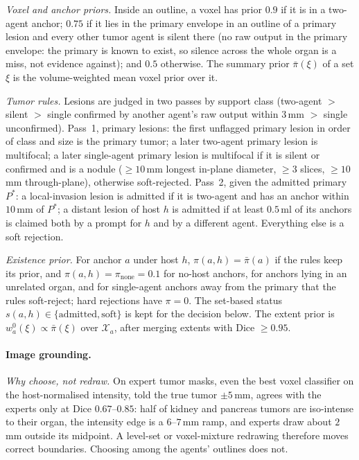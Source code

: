 \documentclass[fleqn,10pt]{olplainarticle}
\begin{document}
\emph{Voxel and anchor priors.} Inside an outline, a voxel has prior $0.9$ if it is in a two-agent anchor; $0.75$ if it
lies in the primary envelope in an outline of a primary lesion and every other tumor agent is silent there (no raw output in
the primary envelope: the primary is known to exist, so silence across the whole organ is a miss, not evidence against);
and $0.5$ otherwise. The summary prior $\bar\pi(\xi)$ of a set $\xi$ is the volume-weighted mean voxel prior over it.

\emph{Tumor rules.} Lesions are judged in two passes by support class (two-agent $>$ silent $>$ single confirmed by another
agent's raw output within $3$\,mm $>$ single unconfirmed). Pass~1, primary lesions: the first unflagged primary lesion in
order of class and size is the primary tumor; a later two-agent primary lesion is multifocal; a later single-agent primary
lesion is multifocal if it is silent or confirmed and is a nodule ($\ge10$\,mm longest in-plane diameter, $\ge3$ slices,
$\ge10$\,mm through-plane), otherwise soft-rejected. Pass~2, given the admitted primary $P^{*}$: a local-invasion lesion is
admitted if it is two-agent and has an anchor within $10$\,mm of $P^{*}$; a distant lesion of host $h$ is admitted if at least
$0.5$\,ml of its anchors is claimed both by a prompt for $h$ and by a different agent. Everything else is a soft rejection.

\emph{Existence prior.} For anchor $a$ under host $h$, $\pi(a,h)=\bar\pi(a)$ if the rules keep its prior, and
$\pi(a,h)=\pi_{\mathrm{none}}=0.1$ for no-host anchors, for anchors lying in an unrelated organ, and for single-agent
anchors away from the primary that the rules soft-reject; hard rejections have $\pi=0$. The set-based status $s(a,h)\in\{\text{admitted},\text{soft}\}$ is kept for the
decision below. The extent prior is $w^{0}_a(\xi)\propto\bar\pi(\xi)$ over $\mathcal{X}_a$, after merging extents with Dice
$\ge0.95$.

\paragraph{Image grounding.}
\label{sec:grounding_details}
\emph{Why choose, not redraw.} On expert tumor masks, even the best voxel classifier on the host-normalised intensity, told
the true tumor $\pm5$\,mm, agrees with the experts only at Dice $0.67$--$0.85$: half of kidney and pancreas tumors are
iso-intense to their organ, the intensity edge is a $6$--$7$\,mm ramp, and experts draw about $2$\,mm outside its midpoint.
A level-set or voxel-mixture redrawing therefore moves correct boundaries. Choosing among the agents' outlines does not.
\end{document}
